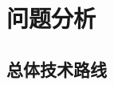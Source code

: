 \documentclass[bwprint]{gmcmthesis}
\numberwithin{equation}{section}
\numberwithin{figure}{section}
\numberwithin{table}{section}
\begin{document}
\section{问题分析}

%
%

\subsection{总体技术路线}

\end{document}
